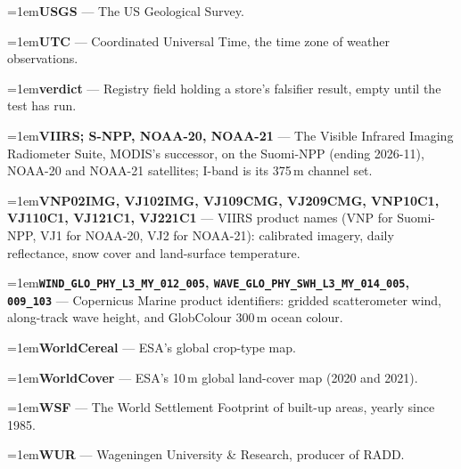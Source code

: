 \documentclass[10pt]{article}
\newcommand{\code}[1]{\texttt{#1}}
\newcommand{\gl}[2]{\par\hangindent=1em\hangafter=1\textbf{#1} --- #2\par}
\begin{document}
\gl{USGS}{The US Geological Survey.}
\gl{UTC}{Coordinated Universal Time, the time zone of weather observations.}
\gl{verdict}{Registry field holding a store's falsifier result, empty until the test has run.}
\gl{VIIRS; S-NPP, NOAA-20, NOAA-21}{The Visible Infrared Imaging Radiometer Suite, MODIS's successor, on the Suomi-NPP (ending 2026-11), NOAA-20 and NOAA-21 satellites; I-band is its 375\,m channel set.}
\gl{VNP02IMG, VJ102IMG, VJ109CMG, VJ209CMG, VNP10C1, VJ110C1, VJ121C1, VJ221C1}{VIIRS product names (VNP for Suomi-NPP, VJ1 for NOAA-20, VJ2 for NOAA-21): calibrated imagery, daily reflectance, snow cover and land-surface temperature.}
\gl{\code{WIND\_GLO\_PHY\_L3\_MY\_012\_005}, \code{WAVE\_GLO\_PHY\_SWH\_L3\_MY\_014\_005}, \code{009\_103}}{Copernicus Marine product identifiers: gridded scatterometer wind, along-track wave height, and GlobColour 300\,m ocean colour.}
\gl{WorldCereal}{ESA's global crop-type map.}
\gl{WorldCover}{ESA's 10\,m global land-cover map (2020 and 2021).}
\gl{WSF}{The World Settlement Footprint of built-up areas, yearly since 1985.}
\gl{WUR}{Wageningen University \& Research, producer of RADD.}
\normalsize
\end{document}
